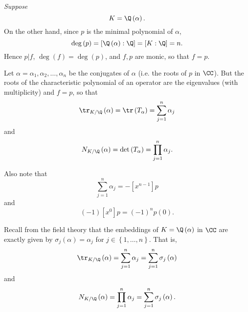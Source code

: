 \documentclass[pmath441]{subfiles}
\begin{document}
    \begin{case}
        \textit{Suppose}
        \begin{equation*}
            K = \Q\left( \alpha \right).
        \end{equation*}
        On the other hand, since $p$ is the minimal polynomial of $\alpha$,
        \begin{equation*}
            \deg\left( p \right) = \left[ \Q\left( \alpha \right):\Q \right] = \left[ K:\Q \right] = n.
        \end{equation*}
        Hence $p|f$, $\deg\left( f \right) = \deg\left( p \right)$, and $f,p$ are monic, so that $f=p$.

        Let $\alpha = \alpha_1, \alpha_2, \ldots, \alpha_n$ be the conjugates of $\alpha$ (i.e. the roots of $p$ in $\CC$). But the roots of the characteristic polynomial of an operator are the eigenvalues (with multiplicity) and $f=p$, so that
        \begin{equation*}
            \tr_{K /\Q}\left( \alpha \right) = \tr\left( T_{\alpha} \right) = \sum^{n}_{j=1} \alpha_j
        \end{equation*}
        and
        \begin{equation*}
            N_{K /\Q}\left( \alpha \right) = \det\left( T_{\alpha} \right) = \prod^{n}_{j=1} \alpha_j.
        \end{equation*}

        Also note that
        \begin{equation*}
            \sum^{n}_{j=1} \alpha_j = -\left[ x^{n-1} \right]p 
        \end{equation*}
        and
        \begin{equation*}
            \left( -1 \right)\left[ x^0 \right]p = \left( -1 \right)^np\left( 0 \right).
        \end{equation*}

        Recall from the field theory that the embeddings of $K=\Q\left( \alpha \right)$ in $\CC$ are exactly given by $\sigma_j\left( \alpha \right) = \alpha_j$ for $j\in\left\lbrace 1,\ldots,n \right\rbrace$. That is,
        \begin{equation*}
            \tr_{K /\Q}\left( \alpha \right) = \sum^{n}_{j=1}\alpha_j = \sum^{n}_{j=1} \sigma_j\left( \alpha \right)
        \end{equation*}
        and
        \begin{equation*}
            N_{K /\Q}\left( \alpha \right) = \prod^{n}_{j=1}\alpha_j = \sum^{n}_{j=1}\sigma_j\left( \alpha \right).
        \end{equation*}
    \end{case}
    
\end{document}
